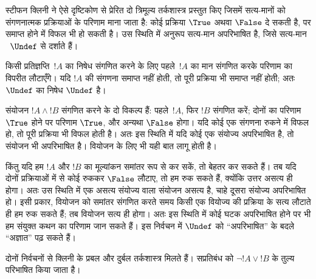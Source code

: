 \documentclass[../../../include/open-logic-section]{subfiles}
\begin{document}


स्टीफन क्लिनी ने ऐसे दृष्टिकोण से प्रेरित दो त्रिमूल्य तर्कशास्त्र प्रस्तुत
किए जिसमें सत्य-मानों को संगणनात्मक प्रक्रियाओं के परिणाम माना जाता है:
कोई प्रक्रिया $\True$ अथवा $\False$ दे सकती है, पर समाप्त होने में विफल भी
हो सकती है। उस स्थिति में अनुरूप सत्य-मान अपरिभाषित है, जिसे सत्य-मान
~$\Undef$ से दर्शाते हैं।

किसी प्रतिज्ञप्ति~$!A$ का निषेध संगणित करने के लिए पहले~$!A$ का मान संगणित
करके परिणाम का विपरीत लौटाएँगे। यदि $!A$ की संगणना समाप्त नहीं होती, तो
पूरी प्रक्रिया भी समाप्त नहीं होती; अतः $\Undef$ का निषेध $\Undef$ है।

संयोजन $!A \land !B$ संगणित करने के दो विकल्प हैं: पहले~$!A$, फिर $!B$
संगणित करें; दोनों का परिणाम~$\True$ होने पर परिणाम $\True$, और अन्यथा
$\False$ होगा। यदि कोई एक संगणना रुकने में विफल हो, तो पूरी प्रक्रिया भी
विफल होती है। अतः इस स्थिति में यदि कोई एक संयोज्य अपरिभाषित है, तो संयोजन
भी अपरिभाषित है। वियोजन के लिए भी यही बात लागू होती है।

किंतु यदि हम $!A$ और $!B$ का मूल्यांकन समांतर रूप से कर सकें, तो बेहतर कर
सकते हैं। तब यदि दोनों प्रक्रियाओं में से कोई रुककर $\False$ लौटाए, तो हम
रुक सकते हैं, क्योंकि उत्तर असत्य ही होगा। अतः उस स्थिति में एक असत्य
संयोज्य वाला संयोजन असत्य है, चाहे दूसरा संयोज्य अपरिभाषित हो। इसी प्रकार,
वियोजन को समांतर संगणित करते समय किसी एक वियोज्य की प्रक्रिया के सत्य
लौटाते ही हम रुक सकते हैं; तब वियोजन सत्य ही होगा। अतः इस स्थिति में कोई
घटक अपरिभाषित होने पर भी हम संयुक्त कथन का परिणाम जान सकते हैं। इस
निर्वचन में $\Undef$ को ``अपरिभाषित'' के बदले ``अज्ञात'' पढ़ सकते हैं।

दोनों निर्वचनों से क्लिनी के प्रबल और दुर्बल तर्कशास्त्र मिलते हैं।
सप्रतिबंध को $\lnot !A \lor !B$ के तुल्य परिभाषित किया जाता है।
\end{document}

